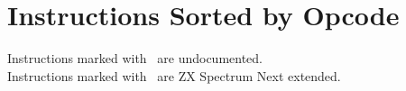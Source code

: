 \chapter{Instructions Sorted by Opcode}


Instructions marked with \UNDOC ~are undocumented.\\
Instructions marked with \ZXN ~are ZX Spectrum Next extended.


